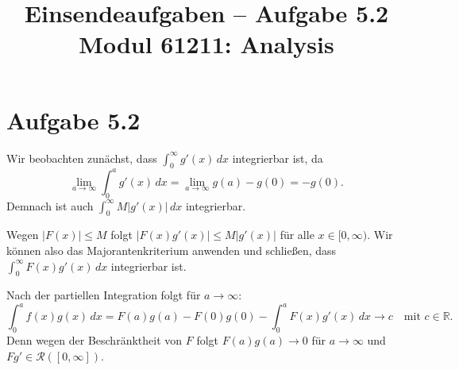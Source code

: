 \documentclass[a4paper,12pt]{article}
\title{Einsendeaufgaben -- Aufgabe 5.2\\[0.5em]
\large Modul 61211: Analysis}
\author{}
\date{}
\begin{document}
\maketitle

\section*{Aufgabe 5.2}

Wir beobachten zunächst, dass $\int_0^\infty g'(x)\,dx$ integrierbar ist, da
\[
  \lim_{a\to\infty} \int_0^a g'(x)\,dx = \lim_{a\to\infty} g(a) - g(0) = -g(0).
\]
Demnach ist auch $\int_0^\infty M|g'(x)|\,dx$ integrierbar.

Wegen $|F(x)| \le M$ folgt $|F(x)g'(x)| \le M|g'(x)|$ für alle $x \in [0,\infty)$. Wir können also das Majorantenkriterium anwenden und schließen, dass $\int_0^\infty F(x)g'(x)\,dx$ integrierbar ist.

Nach der partiellen Integration folgt für $a\to\infty$:
\[
  \int_0^a f(x)g(x)\,dx = F(a)g(a) - F(0)g(0) - \int_0^a F(x)g'(x)\,dx \longrightarrow c \quad \text{mit } c \in \mathbb{R}.
\]
Denn wegen der Beschränktheit von $F$ folgt $F(a)g(a) \to 0$ für $a\to\infty$ und $Fg' \in \mathcal{R}([0,\infty])$.
\end{document}
